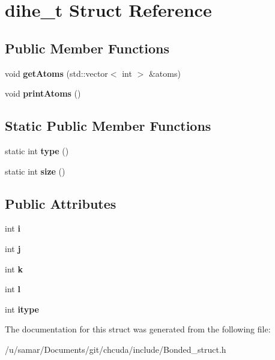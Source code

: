 \hypertarget{structdihe__t}{}\section{dihe\+\_\+t Struct Reference}
\label{structdihe__t}
\subsection*{Public Member Functions}
\begin{DoxyCompactItemize}
\item 
\hypertarget{structdihe__t_ade6c45366819a0996cfac9622fd89fb5}{}\label{structdihe__t_ade6c45366819a0996cfac9622fd89fb5} 
void {\bfseries get\+Atoms} (std\+::vector$<$ int $>$ \&atoms)
\item 
\hypertarget{structdihe__t_a5235950b01a97a561430a1a0584e1c8e}{}\label{structdihe__t_a5235950b01a97a561430a1a0584e1c8e} 
void {\bfseries print\+Atoms} ()
\end{DoxyCompactItemize}
\subsection*{Static Public Member Functions}
\begin{DoxyCompactItemize}
\item 
\hypertarget{structdihe__t_ae81a1e7045fdb69e4efcfae1ae4cf285}{}\label{structdihe__t_ae81a1e7045fdb69e4efcfae1ae4cf285} 
static int {\bfseries type} ()
\item 
\hypertarget{structdihe__t_a7d19374e5c4898a9c7086fda751883c1}{}\label{structdihe__t_a7d19374e5c4898a9c7086fda751883c1} 
static int {\bfseries size} ()
\end{DoxyCompactItemize}
\subsection*{Public Attributes}
\begin{DoxyCompactItemize}
\item 
\hypertarget{structdihe__t_aedb872e978e947d7a260761a0222d321}{}\label{structdihe__t_aedb872e978e947d7a260761a0222d321} 
int {\bfseries i}
\item 
\hypertarget{structdihe__t_aa5dadfdf83f9e185cb57a4103354cd83}{}\label{structdihe__t_aa5dadfdf83f9e185cb57a4103354cd83} 
int {\bfseries j}
\item 
\hypertarget{structdihe__t_ab58a11dfd8ed89f043e923dc0af88d1c}{}\label{structdihe__t_ab58a11dfd8ed89f043e923dc0af88d1c} 
int {\bfseries k}
\item 
\hypertarget{structdihe__t_ab33df3bd4499ebd84abffe6ac7c16f89}{}\label{structdihe__t_ab33df3bd4499ebd84abffe6ac7c16f89} 
int {\bfseries l}
\item 
\hypertarget{structdihe__t_a6582249ff450110218e33099da98201e}{}\label{structdihe__t_a6582249ff450110218e33099da98201e} 
int {\bfseries itype}
\end{DoxyCompactItemize}


The documentation for this struct was generated from the following file\+:\begin{DoxyCompactItemize}
\item 
/u/samar/\+Documents/git/chcuda/include/Bonded\+\_\+struct.\+h\end{DoxyCompactItemize}
